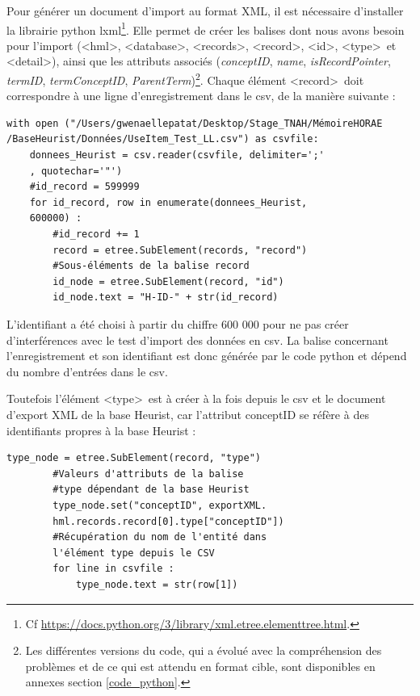 \documentclass[a4paper,12pt,twoside]{book}
\begin{document}
	Pour générer un document d'import au format XML, il est nécessaire d'installer la librairie python lxml\footnote{Cf \url{https://docs.python.org/3/library/xml.etree.elementtree.html}.}. Elle permet de créer les balises dont nous avons besoin pour l'import (\textless hml\textgreater, \textless database\textgreater, \textless records\textgreater, \textless record\textgreater, \textless id\textgreater, \textless type\textgreater~et \textless detail\textgreater ), ainsi que les attributs associés (\textit{conceptID}, \textit{name}, \textit{isRecordPointer}, \textit{termID}, \textit{termConceptID}, \textit{ParentTerm})\footnote{Les différentes versions du code, qui a évolué avec la compréhension des problèmes et de ce qui est attendu en format cible, sont disponibles en annexes section \ref{code_python}.}. Chaque élément \textless record\textgreater~doit correspondre à une ligne d'enregistrement dans le csv, de la manière suivante : 
	\begin{verbatim}
with open ("/Users/gwenaellepatat/Desktop/Stage_TNAH/MémoireHORAE
/BaseHeurist/Données/UseItem_Test_LL.csv") as csvfile:
    donnees_Heurist = csv.reader(csvfile, delimiter=';'
    , quotechar='"')
    #id_record = 599999
    for id_record, row in enumerate(donnees_Heurist,
    600000) :
        #id_record += 1
        record = etree.SubElement(records, "record")
        #Sous-éléments de la balise record
        id_node = etree.SubElement(record, "id")
        id_node.text = "H-ID-" + str(id_record)
	\end{verbatim}
L'identifiant a été choisi à partir du chiffre 600 000 pour ne pas créer d'interférences avec le test d'import des données en csv. La balise concernant l'enregistrement et son identifiant est donc générée par le code python et dépend du nombre d'entrées dans le csv. 

Toutefois l'élément \textless type\textgreater~est à créer à la fois depuis le csv et le document d'export XML de la base Heurist, car l'attribut conceptID se réfère à des identifiants propres à la base Heurist : 
\begin{verbatim}
type_node = etree.SubElement(record, "type")
        #Valeurs d'attributs de la balise 
        #type dépendant de la base Heurist
        type_node.set("conceptID", exportXML.
        hml.records.record[0].type["conceptID"])
        #Récupération du nom de l'entité dans 
        l'élément type depuis le CSV
        for line in csvfile :
            type_node.text = str(row[1])
\end{verbatim}
\end{document}
